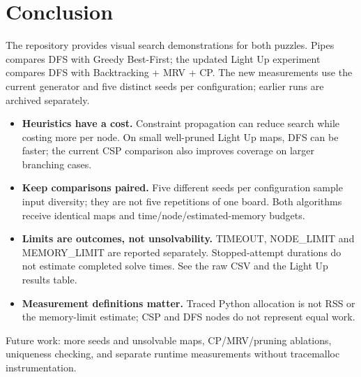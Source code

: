 \documentclass[12pt,a4paper]{article}
\begin{document}




\section{Conclusion}
The repository provides visual search demonstrations for both puzzles. Pipes
compares DFS with Greedy Best-First; the updated Light Up experiment compares DFS
with Backtracking + MRV + CP. The new measurements use the current generator and
five distinct seeds per configuration; earlier runs are archived separately.
\begin{itemize}
\item \textbf{Heuristics have a cost.} Constraint propagation can reduce search
while costing more per node. On small well-pruned Light Up maps, DFS can be faster;
the current CSP comparison also improves coverage on larger branching cases.
\item \textbf{Keep comparisons paired.} Five different seeds per configuration
sample input diversity; they are not five repetitions of one board. Both algorithms
receive identical maps and time/node/estimated-memory budgets.
\item \textbf{Limits are outcomes, not unsolvability.} TIMEOUT, NODE\_LIMIT and
MEMORY\_LIMIT are reported separately. Stopped-attempt durations do not estimate
completed solve times. See the raw CSV and the Light Up results table.
\item \textbf{Measurement definitions matter.} Traced Python allocation is not
RSS or the memory-limit estimate; CSP and DFS nodes do not represent equal work.
\end{itemize}
Future work: more seeds and unsolvable maps, CP/MRV/pruning ablations, uniqueness
checking, and separate runtime measurements without tracemalloc instrumentation.
\end{document}
